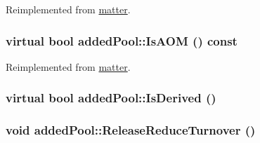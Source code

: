Reimplemented from \hyperlink{classmatter_a59b4566b93dd22923b97976c752783ef}{matter}.\hypertarget{classadded_pool_afdb519f965dcf836634edfa30752d888}{
\subsubsection[{IsAOM}]{\setlength{\rightskip}{0pt plus 5cm}virtual bool addedPool::IsAOM () const}}
\label{classadded_pool_afdb519f965dcf836634edfa30752d888}


Reimplemented from \hyperlink{classmatter_a838d402c6b41deb9d9c20eeabecd94a8}{matter}.\hypertarget{classadded_pool_a526f6f9fdd771c22b602cce6f756307f}{
\subsubsection[{IsDerived}]{\setlength{\rightskip}{0pt plus 5cm}virtual bool addedPool::IsDerived ()}}
\label{classadded_pool_a526f6f9fdd771c22b602cce6f756307f}
\hypertarget{classadded_pool_a53baccaba22ddacc656b75d90d32fa15}{
\subsubsection[{ReleaseReduceTurnover}]{\setlength{\rightskip}{0pt plus 5cm}void addedPool::ReleaseReduceTurnover ()}}
\label{classadded_pool_a53baccaba22ddacc656b75d90d32fa15}


